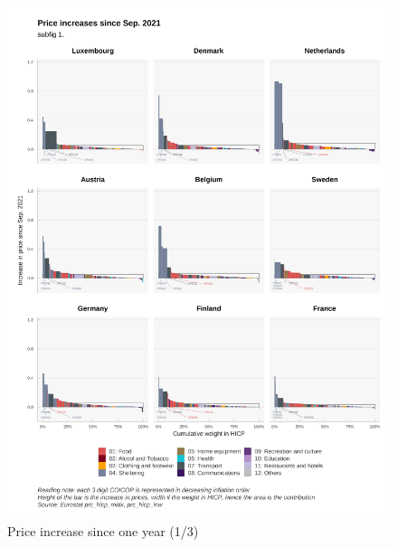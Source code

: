 \documentclass[
  9pt,
  a4paper,
  numbers=noendperiod,
  DIV=12]{scrartcl}
\begin{document}
\begin{figure}

\caption{Price increase since one year (1/3)}

{\centering \includegraphics{svg/depuis_1y_1.png}

}

\end{figure}
\end{document}
